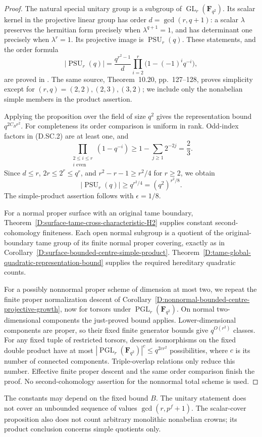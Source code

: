 \begin{proof}
The natural special unitary group is a subgroup of
$\operatorname{GL}_r(\mathbf F_{q^2})$. Its scalar kernel in the
projective linear group has order $d=\gcd(r,q+1)$: a scalar
$\lambda$ preserves the hermitian form precisely when
$\lambda^{q+1}=1$, and has determinant one precisely when
$\lambda^r=1$. Its projective image is $\operatorname{PSU}_r(q)$.
These statements, and the order formula
\[
 |\operatorname{PSU}_r(q)|
   =\frac{q^{r^2-1}}{d}
          \prod_{i=2}^r\bigl(1-(-1)^i q^{-i}\bigr),      \tag{D.SC.2}
\]
are proved in \citet[Chapter~10, p.~118]{Taylor1992ClassicalB}.
The same source, Theorem~10.20, pp.~127--128, proves simplicity
except for $(r,q)=(2,2),(2,3),(3,2)$; we include only the
nonabelian simple members in the product assertion.

Applying the proposition over the field of size $q^2$ gives
the representation bound $q^{2C_Br^2}$. For completeness its
order comparison is uniform in rank. Odd-index factors in
(D.SC.2) are at least one, and
\[
 \prod_{\substack{2\le i\le r\\i\text{ even}}}(1-q^{-i})
       \ge 1-\sum_{j\ge1}2^{-2j}=\frac23.
\]
Since $d\le r$, $2r\le2^r\le q^r$, and
$r^2-r-1\ge r^2/4$ for $r\ge2$, we obtain
\[
           |\operatorname{PSU}_r(q)|\ge q^{r^2/4}
                         =(q^2)^{r^2/8}.
\]
The simple-product assertion follows with $\epsilon=1/8$.

For a normal proper surface with an original tame boundary,
Theorem~\ref{D:surface-tame-cross-characteristic-H2} supplies
constant second-cohomology finiteness. Each open normal subgroup
is a quotient of the original-boundary tame group of its finite
normal proper covering, exactly as in
Corollary~\ref{D:surface-bounded-centre-simple-product}.
Theorem~\ref{D:tame-global-quadratic-representation-bound}
supplies the required hereditary quadratic counts.

For a possibly nonnormal proper scheme of dimension at most two,
we repeat the finite proper normalization descent of
Corollary~\ref{D:nonnormal-bounded-centre-projective-growth},
now for torsors under $\operatorname{PGL}_r(\mathbf F_{q^2})$.
On normal two-dimensional components the just-proved bound
applies. Lower-dimensional components are proper, so their fixed
finite generator bounds give $q^{O(r^2)}$ classes. For any fixed
tuple of restricted torsors, descent isomorphisms on the fixed
double product have at most
$|\operatorname{PGL}_r(\mathbf F_{q^2})|^c\le q^{2cr^2}$
possibilities, where $c$ is its number of connected components.
Triple-overlap relations only reduce this number. Effective
finite proper descent \citep[IX, Theorem~4.7]{C_SGA1} and the
same order comparison finish the proof. No second-cohomology
assertion for the nonnormal total scheme is used.
\end{proof}

\begin{remark}
The constants may depend on the fixed bound $B$. The unitary
statement does not cover an unbounded sequence of values
$\gcd(r,p^f+1)$. The scalar-cover proposition also does not count
arbitrary monolithic nonabelian crowns; its product conclusion
concerns simple quotients only.
\end{remark}
